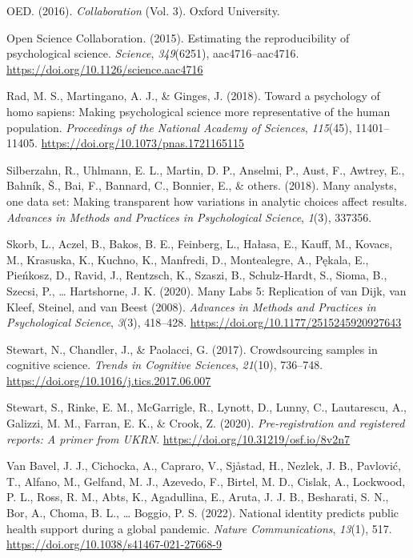 \documentclass[
  man]{apa7}
\newlength{\cslhangindent}
\newlength{\cslentryspacingunit} %
\newenvironment{CSLReferences}[2] %
 {%
  \setlength{\parindent}{0pt}
  \ifodd #1
  \let\oldpar\par
  \def\par{\hangindent=\cslhangindent\oldpar}
  \fi
  \setlength{\parskip}{#2\cslentryspacingunit}
 }%
 {}
\begin{document}
\begin{CSLReferences}{1}{0}
\leavevmode{}%
OED. (2016). \emph{Collaboration} (Vol. 3). Oxford University.

\leavevmode{}%
Open Science Collaboration. (2015). Estimating the reproducibility of psychological science. \emph{Science}, \emph{349}(6251), aac4716--aac4716. \url{https://doi.org/10.1126/science.aac4716}

\leavevmode{}%
Rad, M. S., Martingano, A. J., \& Ginges, J. (2018). Toward a psychology of homo sapiens: Making psychological science more representative of the human population. \emph{Proceedings of the National Academy of Sciences}, \emph{115}(45), 11401--11405. \url{https://doi.org/10.1073/pnas.1721165115}

\leavevmode{}%
Silberzahn, R., Uhlmann, E. L., Martin, D. P., Anselmi, P., Aust, F., Awtrey, E., Bahník, Š., Bai, F., Bannard, C., Bonnier, E., \& others. (2018). Many analysts, one data set: Making transparent how variations in analytic choices affect results. \emph{Advances in Methods and Practices in Psychological Science}, \emph{1}(3), 337356.

\leavevmode{}%
Skorb, L., Aczel, B., Bakos, B. E., Feinberg, L., Hałasa, E., Kauff, M., Kovacs, M., Krasuska, K., Kuchno, K., Manfredi, D., Montealegre, A., Pękala, E., Pieńkosz, D., Ravid, J., Rentzsch, K., Szaszi, B., Schulz-Hardt, S., Sioma, B., Szecsi, P., \ldots{} Hartshorne, J. K. (2020). Many Labs 5: Replication of van Dijk, van Kleef, Steinel, and van Beest (2008). \emph{Advances in Methods and Practices in Psychological Science}, \emph{3}(3), 418--428. \url{https://doi.org/10.1177/2515245920927643}

\leavevmode{}%
Stewart, N., Chandler, J., \& Paolacci, G. (2017). Crowdsourcing samples in cognitive science. \emph{Trends in Cognitive Sciences}, \emph{21}(10), 736--748. \url{https://doi.org/10.1016/j.tics.2017.06.007}

\leavevmode{}%
Stewart, S., Rinke, E. M., McGarrigle, R., Lynott, D., Lunny, C., Lautarescu, A., Galizzi, M. M., Farran, E. K., \& Crook, Z. (2020). \emph{Pre-registration and registered reports: A primer from UKRN}. \url{https://doi.org/10.31219/osf.io/8v2n7}

\leavevmode{}%
Van Bavel, J. J., Cichocka, A., Capraro, V., Sjåstad, H., Nezlek, J. B., Pavlović, T., Alfano, M., Gelfand, M. J., Azevedo, F., Birtel, M. D., Cislak, A., Lockwood, P. L., Ross, R. M., Abts, K., Agadullina, E., Aruta, J. J. B., Besharati, S. N., Bor, A., Choma, B. L., \ldots{} Boggio, P. S. (2022). National identity predicts public health support during a global pandemic. \emph{Nature Communications}, \emph{13}(1), 517. \url{https://doi.org/10.1038/s41467-021-27668-9}


\end{CSLReferences}
\end{document}
